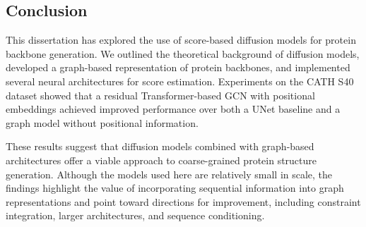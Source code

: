\documentclass[a4paper,12pt]{article}
\begin{document}
\subsection{Conclusion}\label{subsec:conclusion}
This dissertation has explored the use of score-based diffusion models for protein backbone generation. We outlined the theoretical background of diffusion models, developed a graph-based representation of protein backbones, and implemented several neural architectures for score estimation. Experiments on the CATH S40 dataset showed that a residual Transformer-based GCN with positional embeddings achieved improved performance over both a UNet baseline and a graph model without positional information.

These results suggest that diffusion models combined with graph-based architectures offer a viable approach to coarse-grained protein structure generation. Although the models used here are relatively small in scale, the findings highlight the value of incorporating sequential information into graph representations and point toward directions for improvement, including constraint integration, larger architectures, and sequence conditioning.

\clearpage

\appendix
\end{document}
